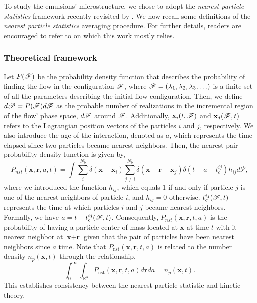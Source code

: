 
To study the emulsions' microstructure, we chose to adopt the \textit{nearest particle statistics} framework recently revisited by \citet{zhang2021ensemble}.
We now recall some definitions of the \textit{nearest particle statistics} averaging procedure. 
For further details, readers are encouraged to refer to \citet{zhang2023evolution} on which this work mostly relies.

\subsubsection*{Theoretical framework}
Let $P(\mathscr{F})$ be the probability density function that describes the probability of finding the flow in the configuration $\mathscr{F}$, where $\mathscr{F} = (\lambda_1,\lambda_2,\lambda_3,\ldots)$ is a finite set of all the parameters describing the initial flow configuration.
Then, we define $d\mathscr{P} = P(\mathscr{F})d\mathscr{F}$ as the probable number of realizations in the incremental region of the flow' phase space, $d\mathscr{F}$ around $\mathscr{F}$.
Additionally,  $\textbf{x}_i(t,\mathscr{F})$ and $\textbf{x}_j(\mathscr{F},t)$ refers to the Lagrangian position vectors of the particles $i$ and $j$, respectively. 
We also introduce the age of the interaction, denoted as $a$, which represents the time elapsed since two particles became nearest neighbors.
Then, the nearest pair probability density function is given by,
\begin{equation}
    P_{nst}(\textbf{x},\textbf{r},a,t)= 
    \int \sum_{i}^{N_b}\delta(\textbf{x}-\textbf{x}_i)
    \sum_{j\neq i}^{N_b}\delta(\textbf{x}+\textbf{r}-\textbf{x}_j) 
    \delta(t+a-t_c^{ij}) 
    h_{ij} d\mathscr{P},
    \label{eq:P_nstij}
\end{equation}
where we introduced the function $h_{ij}$, which equals $1$ if and only if particle $j$ is one of the nearest neighbors of particle $i$, and $h_{ij} = 0$ otherwise. 
$t_c^{ij}(\mathscr{F},t)$ represents the time at which particles $i$ and $j$ became nearest neighbors. 
Formally, we have $a = t - t^{ij}_c(\mathscr{F},t)$.
Consequently, $P_{nst}(\textbf{x},\textbf{r},t,a)$ is the probability of having a particle center of mass located at $\textbf{x}$ at time $t$ with it nearest neighbor at $\textbf{x}+\textbf{r}$ given that the pair of particles have been nearest neighbors since $a$ time.
Note that $P_\text{nst}(\textbf{x},\textbf{r},t,a)$ is related to the number density $n_p(\textbf{x},t)$ through the relationship, 
\begin{equation*}
    \int_0^\infty 
    \int_{\mathbb{R}^3}
     P_\text{nst}(\textbf{x},\textbf{r},t,a) d\textbf{r} da = n_p(\textbf{x},t). 
    \label{eq:Pnst}
\end{equation*}
This establishes consistency between the nearest particle statistic and kinetic theory. 


